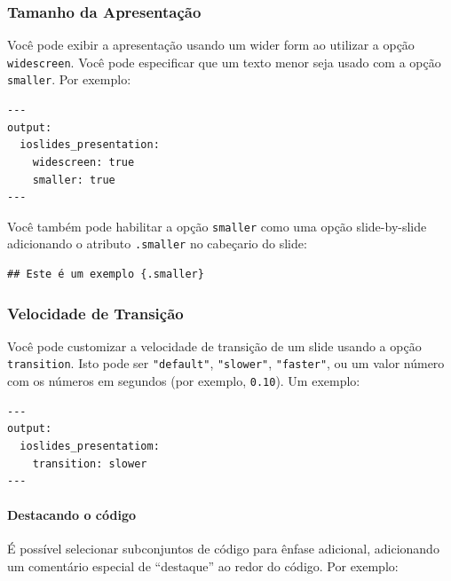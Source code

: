 \documentclass[
]{book}
\begin{document}
\hypertarget{tamanho-da-apresentauxe7uxe3o}{%
\subsubsection*{Tamanho da Apresentação}\label{tamanho-da-apresentauxe7uxe3o}}

Você pode exibir a apresentação usando um wider form ao utilizar a opção \texttt{widescreen}. Você pode especificar que um texto menor seja usado com a opção \texttt{smaller}. Por exemplo:

\begin{verbatim}
---
output:
  ioslides_presentation:
    widescreen: true
    smaller: true
---
\end{verbatim}

Você também pode habilitar a opção \texttt{smaller} como uma opção slide-by-slide adicionando o atributo \texttt{.smaller} no cabeçario do slide:

\begin{verbatim}
## Este é um exemplo {.smaller}
\end{verbatim}

\hypertarget{velocidade-de-transiuxe7uxe3o}{%
\subsubsection*{Velocidade de Transição}\label{velocidade-de-transiuxe7uxe3o}}

Você pode customizar a velocidade de transição de um slide usando a opção \texttt{transition}. Isto pode ser \texttt{"default"}, \texttt{"slower"}, \texttt{"faster"}, ou um valor número com os números em segundos (por exemplo, \texttt{0.10}). Um exemplo:

\begin{verbatim}
---
output:
  ioslides_presentatiom:
    transition: slower
---
\end{verbatim}

\hypertarget{destacando-o-cuxf3digo}{%
\paragraph{Destacando o código}\label{destacando-o-cuxf3digo}}

É possível selecionar subconjuntos de código para ênfase adicional, adicionando um comentário especial de ``destaque'' ao redor do código. Por exemplo:
\end{document}
